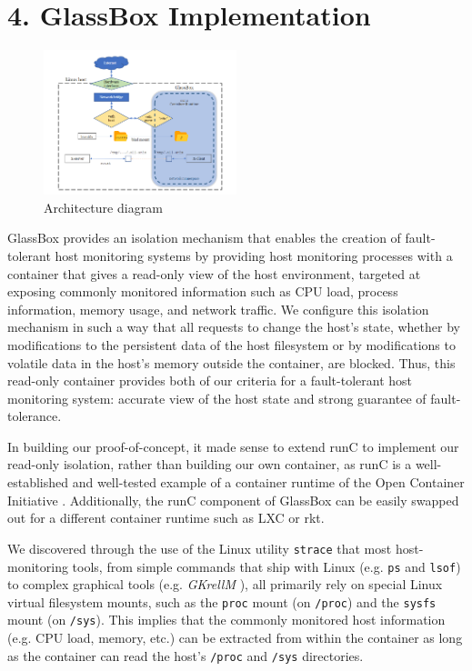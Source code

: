 \documentclass{proc}
\begin{document}
\section*{4. GlassBox Implementation}

\begin{figure}
\includegraphics[width=0.5\textwidth]{architecture}
\caption{Architecture diagram}
\end{figure}

GlassBox provides an isolation mechanism that enables the creation of fault-tolerant host monitoring systems by providing host monitoring processes with a container that gives a read-only view of the host environment, targeted at exposing commonly monitored information such as CPU load, process information, memory usage, and network traffic. We configure this isolation mechanism in such a way that all requests to change the host's state, whether by modifications to the persistent data of the host filesystem or by modifications to volatile data in the host's memory outside the container, are blocked. Thus, this read-only container provides both of our criteria for a fault-tolerant host monitoring system: accurate view of the host state and strong guarantee of fault-tolerance.

In building our proof-of-concept, it made sense to extend runC to implement our read-only isolation, rather than building our own container, as runC is a well-established and well-tested example of a container runtime of the Open Container Initiative \cite{opencontainerinitiative}. Additionally, the runC component of GlassBox can be easily swapped out for a different container runtime such as LXC or rkt.

We discovered through the use of the Linux utility \texttt{strace} that most host-monitoring tools, from simple commands that ship with Linux (e.g. \texttt{ps} and \texttt{lsof}) to complex graphical tools (e.g. \textit{GKrellM} \cite{gkrellm}), all primarily rely on special Linux virtual filesystem mounts, such as the \texttt{proc} mount (on \texttt{/proc}) and the \texttt{sysfs} mount (on \texttt{/sys}). This implies that the commonly monitored host information (e.g. CPU load, memory, etc.) can be extracted from within the container as long as the container can read the host's \texttt{/proc} and \texttt{/sys} directories.
\end{document}
